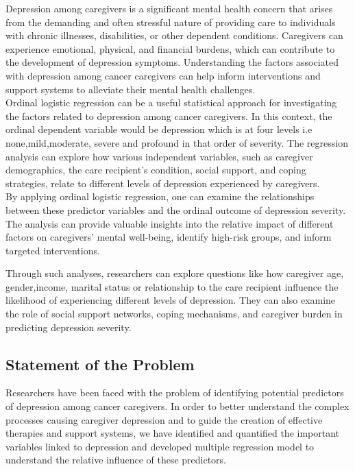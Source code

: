 \documentclass[12pt]{article}
\numberwithin{equation}{section}
\begin{document}
Depression among caregivers is a significant mental health concern that arises from the demanding and often stressful nature of providing care to individuals with chronic illnesses, disabilities, or other dependent conditions. Caregivers can experience emotional, physical, and financial burdens, which can contribute to the development of depression symptoms. Understanding the factors associated with depression among cancer caregivers can help inform interventions and support systems to alleviate their mental health challenges.\\

Ordinal logistic regression can be a useful statistical approach for investigating the factors related to depression among cancer caregivers. In this context, the ordinal dependent variable would be depression which is at four levels i.e none,mild,moderate, severe and profound in that order of severity. The regression analysis can explore how various independent variables, such as caregiver demographics, the care recipient's condition, social support, and coping strategies, relate to different levels of depression experienced by caregivers.\\

By applying ordinal logistic regression, one can examine the relationships between these predictor variables and the ordinal outcome of depression severity. The analysis can provide valuable insights into the relative impact of different factors on caregivers' mental well-being, identify high-risk groups, and inform targeted interventions.

Through such analyses, researchers can explore questions like how caregiver age, gender,income, marital status or relationship to the care recipient influence the likelihood of experiencing different levels of depression. They can also examine the role of social support networks, coping mechanisms, and caregiver burden in predicting depression severity.\\

\subsection{Statement of the Problem}
Researchers have been faced with the problem of identifying potential predictors of depression among cancer caregivers.  In order to better understand the complex processes causing caregiver depression and to guide the creation of effective therapies and support systems, we have identified and quantified the important variables linked to depression and developed multiple regression model to understand the relative influence of these predictors.
\end{document}

